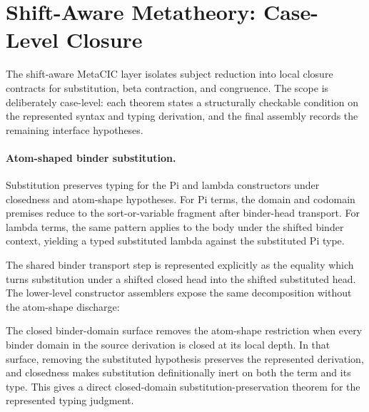 \section*{Shift-Aware Metatheory: Case-Level Closure}\label{sec:self-comp-shift-aware-metatheory}

The shift-aware MetaCIC layer isolates subject reduction into local closure contracts for
substitution, beta contraction, and congruence. The scope is deliberately
case-level: each theorem states a structurally checkable condition on the
represented syntax and typing derivation, and the final assembly records the
remaining interface hypotheses.

\paragraph{Atom-shaped binder substitution.}
Substitution preserves typing for the Pi and lambda constructors under
closedness and atom-shape hypotheses. For Pi terms, the domain and codomain
premises reduce to the sort-or-variable fragment after binder-head transport.
For lambda terms, the same pattern applies to the body under the shifted binder
context, yielding a typed substituted lambda against the substituted Pi type.

The shared binder transport step is represented explicitly as the equality
which turns substitution under a shifted closed head into the shifted
substituted head.
The lower-level constructor assemblers expose the same decomposition without
the atom-shape discharge:

The closed binder-domain surface removes the atom-shape restriction when every
binder domain in the source derivation is closed at its local depth. In that
surface, removing the substituted hypothesis preserves the represented
derivation, and closedness makes substitution definitionally inert on both the
term and its type. This gives a direct closed-domain substitution-preservation
theorem for the represented typing judgment.


